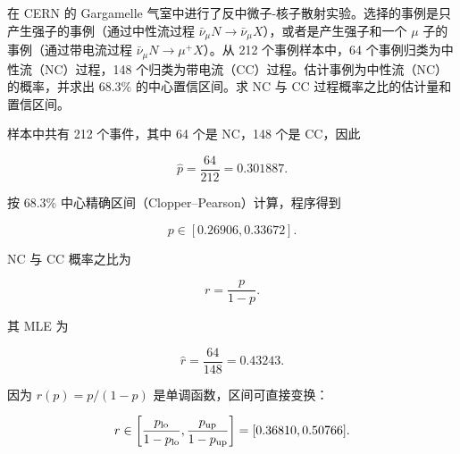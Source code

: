 \begin{question}
在 CERN 的 Gargamelle
气室中进行了反中微子-核子散射实验。选择的事例是只产生强子的事例（通过中性流过程
\(\bar\nu_\mu N\to\bar\nu_\mu X\)），或者是产生强子和一个 \(\mu\)
子的事例（通过带电流过程 \(\bar\nu_\mu N\to\mu^+X\)）。从 212
个事例样本中，64 个事例归类为中性流（NC）过程，148
个归类为带电流（CC）过程。估计事例为中性流（NC）的概率，并求出 68.3\%
的中心置信区间。求 NC 与 CC 过程概率之比的估计量和置信区间。
\begin{solution}
样本中共有 212 个事件，其中 64 个是 NC，148 个是 CC，因此

\[
\hat p=\frac{64}{212}=0.301887.
\]

按 68.3\% 中心精确区间（Clopper--Pearson）计算，程序得到

\[
p\in[0.26906,0.33672].
\]

NC 与 CC 概率之比为

\[
r=\frac{p}{1-p}.
\]

其 MLE 为

\[
\hat r=\frac{64}{148}=0.43243.
\]

因为 \(r(p)=p/(1-p)\) 是单调函数，区间可直接变换：

\[
r\in\left[
\frac{p_{\rm lo}}{1-p_{\rm lo}},
\frac{p_{\rm up}}{1-p_{\rm up}}
\right]
=[0.36810,0.50766].
\]
\end{solution}
\end{question}


